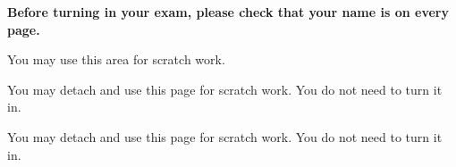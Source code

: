 \documentclass[twoside,12pt]{article}
\begin{document}
\vfill
\begin{center}
    \textbf{Before turning in your exam, please check that your name is on every page.}
\end{center}


\newcommand{\scratchpage}{
    \pagestyle{plain}
    \begin{center}
        You may use this area for scratch work.
    \end{center}
}

\newcommand{\scratchpagedetach}{
    \pagestyle{plain}
    \begin{center}
        You may detach and use this page for scratch work. You do not need to turn it in.
    \end{center}
}

\ifshowsoln
\else
    \newpage
    \scratchpage{}
    \newpage
    \scratchpagedetach{}
    \newpage
    \scratchpagedetach{}
\fi
\end{document}
